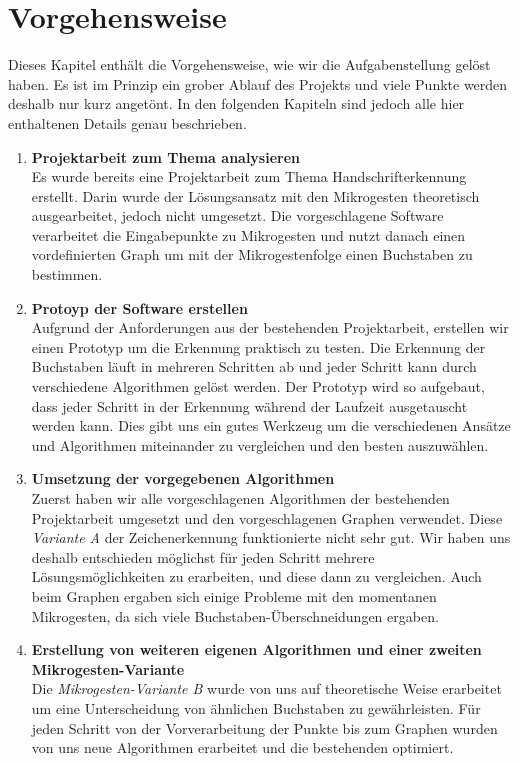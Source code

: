 \chapter{Vorgehensweise}
Dieses Kapitel enthält die Vorgehensweise, wie wir die Aufgabenstellung gelöst haben. Es ist im Prinzip ein grober Ablauf des Projekts und viele Punkte werden deshalb nur kurz angetönt. In den folgenden Kapiteln sind jedoch alle hier enthaltenen Details genau beschrieben.

\begin{enumerate}
\item \textbf{Projektarbeit zum Thema analysieren} \\ 
Es wurde bereits eine Projektarbeit \cite{zeichenerkennung_pa} zum Thema Handschrifterkennung erstellt. Darin wurde der Lösungsansatz mit den Mikrogesten theoretisch ausgearbeitet, jedoch nicht umgesetzt. Die vorgeschlagene Software verarbeitet die Eingabepunkte zu Mikrogesten und nutzt danach einen vordefinierten Graph um mit der Mikrogestenfolge einen Buchstaben zu bestimmen.

\item \textbf{Protoyp der Software erstellen} \\
Aufgrund der Anforderungen aus der bestehenden Projektarbeit, erstellen wir einen Prototyp um die Erkennung praktisch zu testen. Die Erkennung der Buchstaben läuft in mehreren Schritten ab und jeder Schritt kann durch verschiedene Algorithmen gelöst werden. Der Prototyp wird so aufgebaut, dass jeder Schritt in der Erkennung während der Laufzeit ausgetauscht werden kann. Dies gibt uns ein gutes Werkzeug um die verschiedenen Ansätze und Algorithmen miteinander zu vergleichen und den besten auszuwählen.

\item \textbf{Umsetzung der vorgegebenen Algorithmen} \\
Zuerst haben wir alle vorgeschlagenen Algorithmen der bestehenden Projektarbeit umgesetzt und den vorgeschlagenen Graphen verwendet. Diese \emph{Variante A} der Zeichenerkennung funktionierte nicht sehr gut. Wir haben uns deshalb entschieden möglichst für jeden Schritt mehrere Lösungsmöglichkeiten zu erarbeiten, und diese dann zu vergleichen. Auch beim Graphen ergaben sich einige Probleme mit den momentanen Mikrogesten, da sich viele Buchstaben-Überschneidungen ergaben.

\item \textbf{Erstellung von weiteren eigenen Algorithmen und einer zweiten Mikrogesten-Variante} \\
Die \emph{Mikrogesten-Variante B} wurde von uns auf theoretische Weise erarbeitet um eine Unterscheidung von ähnlichen Buchstaben zu gewährleisten. Für jeden Schritt von der Vorverarbeitung der Punkte bis zum Graphen wurden von uns neue Algorithmen erarbeitet und die bestehenden optimiert. 


\end{enumerate}
